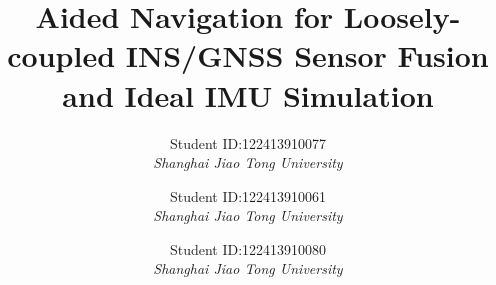 \documentclass[conference]{IEEEtran}
\begin{document}
\title{Aided Navigation for Loosely-coupled INS/GNSS Sensor Fusion and Ideal IMU Simulation\\
}

\author{
Student ID:122413910077\\
\textit{Shanghai Jiao Tong University}\\

\and
{}
Student ID:122413910061\\
\textit{Shanghai Jiao Tong University}\\

\and
{}
Student ID:122413910080\\
\textit{Shanghai Jiao Tong University}\\
 }

\maketitle
\end{document}

